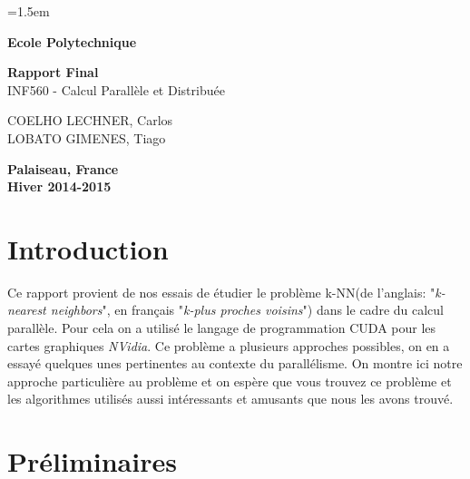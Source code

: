 \documentclass[12pt,oneside]{article}
\begin{document}
\baselineskip=1.5em
\thispagestyle{empty}

\begin{center}
{\Huge \bf Ecole Polytechnique}\\


\vspace{5cm}

{\LARGE{\bf Rapport Final \\ }}
INF560 - Calcul Parallèle et Distribuée

\vspace{6cm}
COELHO LECHNER, Carlos\\
LOBATO GIMENES, Tiago\\
\end{center}

\vspace{5cm}

\begin{center}
\textbf{Palaiseau, France \\  Hiver 2014-2015}
\end{center}


\newpage
\thispagestyle{empty}

\setcounter{tocdepth}{2}
\tableofcontents

\listoffigures

\newpage
\setcounter{page}{1}
\section{Introduction}

Ce rapport provient de nos essais de étudier le problème k-NN(de l'anglais: "\textit{k- nearest neighbors}", en français "\textit{k-plus proches voisins}") dans le cadre du calcul parallèle. Pour cela on a utilisé le langage de programmation CUDA pour les cartes graphiques \textit{NVidia}. Ce problème a plusieurs approches possibles, on en a essayé quelques unes pertinentes au contexte du parallélisme. On montre ici notre approche particulière au problème et on espère que vous trouvez ce problème et les algorithmes utilisés aussi intéressants et amusants que nous les avons trouvé.



\section{Préliminaires}
\end{document}
